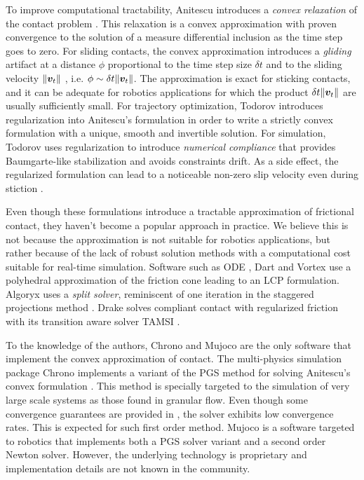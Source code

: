 To improve computational tractability, Anitescu introduces a \textit{convex
relaxation} of the contact problem \cite{bib:anitescu2006}. This relaxation is a
convex approximation with proven convergence to the solution of a measure
differential inclusion as the time step goes to zero. For sliding contacts,
the convex approximation introduces a \emph{gliding} artifact at a distance $\phi$
proportional to the time step size $\delta t$ and to the sliding velocity
$\Vert{\bm{v}}_t\Vert$ \cite{bib:mazhar2014}, i.e. $\phi\sim \delta
t\Vert{\bm{v}}_t\Vert$. The approximation is exact for sticking contacts,
and it can be adequate for robotics applications for which the product $\delta
t\Vert{\bm{v}}_t\Vert$ are usually sufficiently small. For trajectory optimization,
Todorov \cite{bib:todorov2011} introduces regularization into Anitescu's
formulation in order to write a strictly convex formulation with a unique,
smooth and invertible solution. For simulation, Todorov \cite{bib:todorov2014}
uses regularization to introduce \emph{numerical compliance} that provides
Baumgarte-like stabilization and avoids constraints drift. As a side effect, the
regularized formulation can lead to a noticeable non-zero slip velocity even
during stiction \cite{bib:simbenchmark}.

Even though these formulations introduce a tractable approximation of frictional
contact, they haven't become a popular approach in practice. We
believe this is not because the approximation is not suitable for robotics
applications, but rather because of the lack of robust solution methods with a
computational cost suitable for real-time simulation. Software such as ODE
\cite{bib:ode}, Dart \cite{bib:dart} and Vortex \cite{bib:vortex} use a
polyhedral approximation of the friction cone leading to an LCP formulation.
Algoryx \cite{bib:algoryx} uses a \emph{split solver}, reminiscent of one
iteration in the staggered projections method \cite{bib:Kaufman2008}. Drake
\cite{bib:drake} solves compliant contact with regularized friction with its
transition aware solver TAMSI \cite{bib:castro2020}. 

To the knowledge of the authors, Chrono \cite{bib:hrono2016} and Mujoco
\cite{bib:mujoco} are the only software that implement the convex approximation
of contact. The multi-physics simulation package Chrono implements a variant of
the PGS method for solving Anitescu's convex formulation \cite{bib:tasora2011}.
This method is specially targeted to the simulation of very large scale systems
as those found in granular flow. Even though some convergence guarantees are
provided in \cite{bib:anitescu2010}, the solver exhibits low convergence rates.
This is expected for such first order method. Mujoco is a software targeted to
robotics that implements both a PGS solver variant \cite{bib:todorov2014} and a
second order Newton solver. However, the underlying technology is proprietary and
implementation details are not known in the community.

